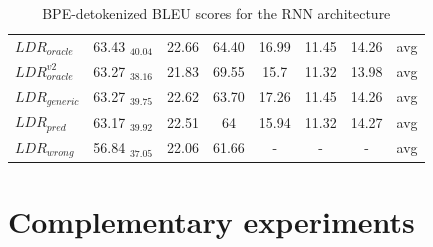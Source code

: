 \documentclass[11pt,a4paper]{article}
\begin{document}
\begin{table}[!h]
\begin{center}
{\begin{tabular}{|l|ccc|ccc||c|}
\hline
$LDR_{oracle}$   & 63.43 $_{40.04}$ & 22.66 & 64.40 & 16.99 & 11.45 & 14.26 & avg\\
$LDR^{v2}_{oracle}$   & 63.27 $_{38.16}$ & 21.83 & 69.55 & 15.7 & 11.32 & 13.98 & avg\\
$LDR_{generic}$ & 63.27 $_{39.75}$ & 22.62 & 63.70 & 17.26 & 11.45 & 14.26 & avg\\
$LDR_{pred}$        & 63.17 $_{39.92}$ & 22.51 & 64 & 15.94 & 11.32 & 14.27 & avg\\
$LDR_{wrong}$   & 56.84 $_{37.05}$ & 22.06 & 61.66 & - & - & - & avg \\
\hline
\end{tabular}
} %
\end{center}
\caption{BPE-detokenized BLEU scores for the RNN architecture \label{tab:results-rnn}}
\end{table}

\section{Complementary experiments\label{sec:Discussion}}
\end{document}
